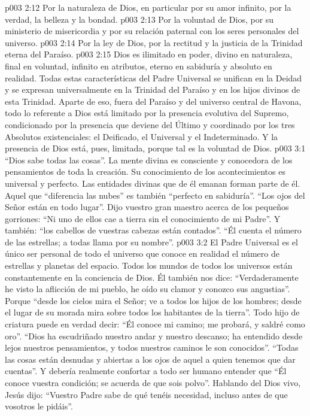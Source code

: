 \vs p003 2:12 Por la naturaleza de Dios, en particular por su amor infinito, por la verdad, la belleza y la bondad.
\vs p003 2:13 Por la voluntad de Dios, por su ministerio de misericordia y por su relación paternal con los seres personales del universo.
\vs p003 2:14 Por la ley de Dios, por la rectitud y la justicia de la Trinidad eterna del Paraíso.
\vs p003 2:15 \pc Dios es ilimitado en poder, divino en naturaleza, final en voluntad, infinito en atributos, eterno en sabiduría y absoluto en realidad. Todas estas características del Padre Universal se unifican en la Deidad y se expresan universalmente en la Trinidad del Paraíso y en los hijos divinos de esta Trinidad. Aparte de eso, fuera del Paraíso y del universo central de Havona, todo lo referente a Dios está limitado por la presencia evolutiva del Supremo, condicionado por la presencia que deviene del Último y coordinado por los tres Absolutos existenciales: el Deificado, el Universal y el Indeterminado. Y la presencia de Dios está, pues, limitada, porque tal es la voluntad de Dios.
\vs p003 3:1 “Dios sabe todas las cosas”. La mente divina es consciente y conocedora de los pensamientos de toda la creación. Su conocimiento de los acontecimientos es universal y perfecto. Las entidades divinas que de él emanan forman parte de él. Aquel que “diferencia las nubes” es también “perfecto en sabiduría”. “Los ojos del Señor están en todo lugar”. Dijo vuestro gran maestro acerca de los pequeños gorriones: “Ni uno de ellos cae a tierra sin el conocimiento de mi Padre”. Y también: “los cabellos de vuestras cabezas están contados”. “Él cuenta el número de las estrellas; a todas llama por su nombre”.
\vs p003 3:2 El Padre Universal es el único ser personal de todo el universo que conoce en realidad el número de estrellas y planetas del espacio. Todos los mundos de todos los universos están constantemente en la conciencia de Dios. Él también nos dice: “Verdaderamente he visto la aflicción de mi pueblo, he oído su clamor y conozco sus angustias”. Porque “desde los cielos mira el Señor; ve a todos los hijos de los hombres; desde el lugar de su morada mira sobre todos los habitantes de la tierra”. Todo hijo de criatura puede en verdad decir: “Él conoce mi camino; me probará, y saldré como oro”. “Dios ha escudriñado nuestro andar y nuestro descanso; ha entendido desde lejos nuestros pensamientos, y todos nuestros caminos le son conocidos”. “Todas las cosas están desnudas y abiertas a los ojos de aquel a quien tenemos que dar cuentas”. Y debería realmente confortar a todo ser humano entender que “Él conoce vuestra condición; se acuerda de que sois polvo”. Hablando del Dios vivo, Jesús dijo: “Vuestro Padre sabe de qué tenéis necesidad, incluso antes de que vosotros le pidáis”.
